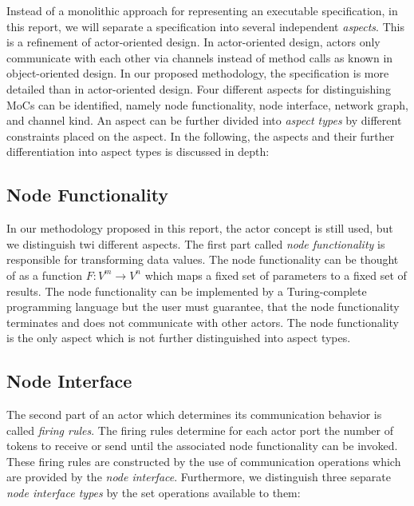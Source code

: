 Instead of a monolithic approach for representing an executable specification,
in this report, we will separate a specification into several
independent \emph{aspects}.
This is a refinement of actor-oriented design.
In actor-oriented design, actors only
communicate with each other via channels instead of method calls as known
in object-oriented design. In our proposed methodology, the specification is more
detailed than in actor-oriented design.
Four different aspects for distinguishing MoCs can be identified,
namely node functionality, node interface, network graph, and
channel kind. An aspect can be further divided into
\emph{aspect types} by different constraints placed on the aspect.
In the following, the aspects and their further
differentiation into aspect types is discussed in depth:

\subsection{Node Functionality}\label{node-functionality}

In our methodology proposed in this report, the actor concept is still used,
but we distinguish twi different aspects.
The first part called \emph{node functionality} is responsible
for transforming data values. The node functionality can be
thought of as a function $F: V^{m} \to V^{n}$  which maps a fixed set
of parameters to a fixed set of results. The node functionality
can be implemented by a Turing-complete programming language but
the user must guarantee, that the node functionality terminates
and does not communicate with other actors.
The node functionality is the only aspect which is not further distinguished
into aspect types.

\subsection{Node Interface}\label{node-interface}

The second part of an actor which determines its communication
behavior is called \emph{firing rules}. The firing rules
determine for each actor port the number of tokens to receive or send
until the associated node functionality can be invoked. These firing rules are
constructed by the use of communication operations which are
provided by the \emph{node interface}. Furthermore, we
distinguish three separate \emph{node interface types} by the set
operations available to them:

